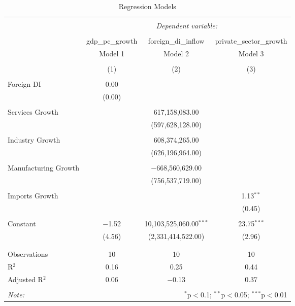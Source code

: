 
\begin{table}[!htbp] \centering 
  \caption{Regression Models} 
  \label{} 
\begin{tabular}{@{\extracolsep{5pt}}lccc} 
\\[-1.8ex]\hline 
\hline \\[-1.8ex] 
 & \multicolumn{3}{c}{\textit{Dependent variable:}} \\ 
\cline{2-4} 
\\[-1.8ex] & gdp\_pc\_growth & foreign\_di\_inflow & private\_sector\_growth \\ 
 & Model 1 & Model 2 & Model 3 \\ 
\\[-1.8ex] & (1) & (2) & (3)\\ 
\hline \\[-1.8ex] 
 Foreign DI & 0.00 &  &  \\ 
  & (0.00) &  &  \\ 
  & & & \\ 
 Services Growth &  & 617,158,083.00 &  \\ 
  &  & (597,628,128.00) &  \\ 
  & & & \\ 
 Industry Growth &  & 608,374,265.00 &  \\ 
  &  & (626,196,964.00) &  \\ 
  & & & \\ 
 Manufacturing Growth &  & $-$668,560,629.00 &  \\ 
  &  & (756,537,719.00) &  \\ 
  & & & \\ 
 Imports Growth &  &  & 1.13$^{**}$ \\ 
  &  &  & (0.45) \\ 
  & & & \\ 
 Constant & $-$1.52 & 10,103,525,060.00$^{***}$ & 23.75$^{***}$ \\ 
  & (4.56) & (2,331,414,522.00) & (2.96) \\ 
  & & & \\ 
\hline \\[-1.8ex] 
Observations & 10 & 10 & 10 \\ 
R$^{2}$ & 0.16 & 0.25 & 0.44 \\ 
Adjusted R$^{2}$ & 0.06 & $-$0.13 & 0.37 \\ 
\hline 
\hline \\[-1.8ex] 
\textit{Note:}  & \multicolumn{3}{r}{$^{*}$p$<$0.1; $^{**}$p$<$0.05; $^{***}$p$<$0.01} \\ 
\end{tabular} 
\end{table} 
